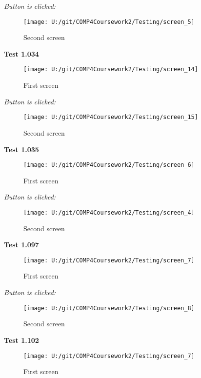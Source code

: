 \textit{Button is clicked: }

\begin{figure}[H]
    \label{fig: Second Screen}\caption{Second screen}
    \texttt{[image: U:/git/COMP4Coursework2/Testing/screen\_5]}
\end{figure}

\textbf{Test 1.034}

\begin{figure}[H]
    \label{fig: First Screen}\caption{First screen}
    \texttt{[image: U:/git/COMP4Coursework2/Testing/screen\_14]}
\end{figure}

\textit{Button is clicked: }

\begin{figure}[H]
    \label{fig: Second Screen}\caption{Second screen}
    \texttt{[image: U:/git/COMP4Coursework2/Testing/screen\_15]}
\end{figure}

\textbf{Test 1.035}

\begin{figure}[H]
    \label{fig: First Screen}\caption{First screen}
    \texttt{[image: U:/git/COMP4Coursework2/Testing/screen\_6]}
\end{figure}

\textit{Button is clicked: }

\begin{figure}[H]
    \label{fig: Second Screen}\caption{Second screen}
    \texttt{[image: U:/git/COMP4Coursework2/Testing/screen\_4]}
\end{figure}

\textbf{Test 1.097}

\begin{figure}[H]
    \label{fig: First Screen}\caption{First screen}
    \texttt{[image: U:/git/COMP4Coursework2/Testing/screen\_7]}
\end{figure}

\textit{Button is clicked: }

\begin{figure}[H]
    \label{fig: Second Screen}\caption{Second screen}
    \texttt{[image: U:/git/COMP4Coursework2/Testing/screen\_8]}
\end{figure}

\textbf{Test 1.102}

\begin{figure}[H]
    \label{fig: First Screen}\caption{First screen}
    \texttt{[image: U:/git/COMP4Coursework2/Testing/screen\_7]}
\end{figure}

